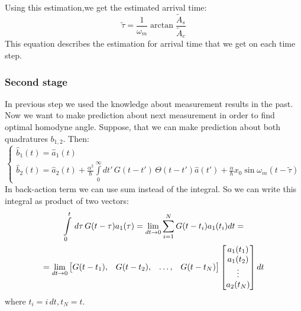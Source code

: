 Using this estimation,we get the estimated arrival time:
\begin{equation}
 \tilde{\tau} = \frac{1}{\omega_m}\arctan \frac{\tilde{A}_s}{\tilde{A}_c}
\end{equation}
This equation describes the estimation for arrival time that we get on each time step.

\subsubsection{Second stage}
In previous step we used the knowledge about measurement results in the past. Now we want to make prediction about next measurement in order to find optimal homodyne angle.
Suppose, that we can make prediction about both quadratures $b_{1,2}$. Then:
\begin{equation}
 \begin{cases}\label{b1b2}
  \hat{b}_1(t) = \hat{a}_1(t) \\
  \hat{b}_2(t) = \hat{a}_2(t) + \frac{\alpha^2}{\hbar}\int\limits_0^{\infty} dt' \, G(t-t') \,\Theta(t-t') \hat{a}(t') + \frac{\alpha}{\hbar}x_0 \sin \omega_m (t-\tilde{\tau})
 \end{cases}
\end{equation}
In back-action term we can use sum instead of the integral. So we can write this integral as product of two vectors:
\begin{multline}
 \int\limits_{0}^{t}\,d\tau\, G(t-\tau)a_1(\tau) = \lim\limits_{dt\rightarrow0}\sum\limits_{i=1}^NG(t-t_i) a_1(t_i) dt = \\ =\lim\limits_{dt\rightarrow0} 
\begin{bmatrix}
 G(t-t_1), & G(t-t_2), & \hdots, & G(t-t_N)
\end{bmatrix}
\begin{bmatrix}
 a_1(t_1)\\a_1(t_2)\\\vdots\\a_2(t_N)
\end{bmatrix}
dt
\end{multline}
where $t_i = i\,dt, t_N = t$.

